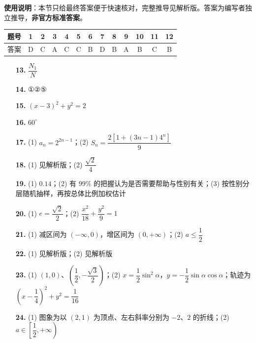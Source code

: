 
\begin{gknotice}
\textbf{使用说明}：本节只给最终答案便于快速核对，完整推导见解析版。答案为编写者独立推导，\textbf{非官方标准答案}。
\end{gknotice}

\begin{center}\begin{tabular}{ccccccccccccc}
\toprule
题号 & 1 & 2 & 3 & 4 & 5 & 6 & 7 & 8 & 9 & 10 & 11 & 12 \\
\midrule
答案 & D & C & A & C & C & B & D & B & A & B & C & B \\
\bottomrule
\end{tabular}\end{center}

\begin{itemize}[leftmargin=2.6em]
  \item[\textbf{13.}] $\dfrac{N_1}{N}$
  \item[\textbf{14.}] ①②⑤
  \item[\textbf{15.}] $(x-3)^2+y^2=2$
  \item[\textbf{16.}] $60^\circ$
\end{itemize}

\begin{itemize}[leftmargin=2.6em]
  \item[\textbf{17.}] (1) $a_n=2^{2n-1}$；(2) $S_n=\dfrac{2\left[1+(3n-1)4^n\right]}9$
  \item[\textbf{18.}] (1) 见解析版；(2) $\dfrac{\sqrt2}{4}$
  \item[\textbf{19.}] (1) $0.14$；(2) 有 $99\%$ 的把握认为是否需要帮助与性别有关；(3) 按性别分层随机抽样，再按总体比例加权估计
  \item[\textbf{20.}] (1) $e=\dfrac{\sqrt2}{2}$；(2) $\dfrac{x^2}{18}+\dfrac{y^2}{9}=1$
  \item[\textbf{21.}] (1) 减区间为 $(-\infty,0)$，增区间为 $(0,+\infty)$；(2) $a\leq\dfrac12$
  \item[\textbf{22.}] (1) 见解析版；(2) 见解析版
  \item[\textbf{23.}] (1) $(1,0)$、$\left(\dfrac12,-\dfrac{\sqrt3}{2}\right)$；(2) $x=\dfrac12\sin^2\alpha$，$y=-\dfrac12\sin\alpha\cos\alpha$；轨迹为 $\left(x-\dfrac14\right)^2+y^2=\dfrac1{16}$
  \item[\textbf{24.}] (1) 图象为以 $(2,1)$ 为顶点、左右斜率分别为 $-2\text{、}2$ 的折线；(2) $a\in\left[\dfrac12,+\infty\right)$
\end{itemize}
